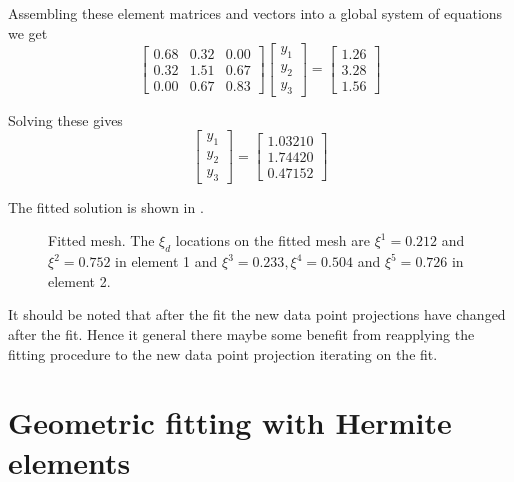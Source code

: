 Assembling these element matrices and vectors into a global system of
equations we get
\begin{equation}
  \begin{bmatrix}
    0.68 & 0.32 & 0.00 \\
    0.32 & 1.51 & 0.67 \\
    0.00 & 0.67 & 0.83 
  \end{bmatrix}
  \begin{bmatrix}
    y_{1} \\
    y_{2} \\
    y_{3}
  \end{bmatrix} =
  \begin{bmatrix}
    1.26 \\
    3.28 \\
    1.56
  \end{bmatrix}
\end{equation}

Solving these gives
\begin{equation}
  \begin{bmatrix}
    y_{1} \\
    y_{2} \\
    y_{3}
  \end{bmatrix} =
  \begin{bmatrix}
    1.03210 \\
    1.74420 \\
    0.47152
  \end{bmatrix}
\end{equation}

The fitted solution is shown in .
\begin{figure}[htpb] \centering
  \caption{Fitted mesh. The $\xi_{d}$ locations on the fitted mesh are
    $\xi^{1}=0.212$ and $\xi^{2}=0.752$ in element 1 and $\xi^{3}=0.233,
    \xi^{4}=0.504$ and $\xi^{5}=0.726$ in element 2.}
  \label{fig:fixedxifitafter}
\end{figure}
It should be noted that after the fit the new data point projections have
changed after the fit. Hence it general there maybe some benefit from
reapplying the fitting procedure to the new data point projection \ie 
iterating on the fit.

\section{Geometric fitting with Hermite elements}

